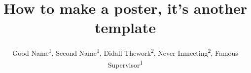 \title{How to make a poster, it's another template}
\author{Good Name\textsuperscript{1}, Second Name\textsuperscript{1}, Didall Thework\textsuperscript{2}, Never Inmeeting\textsuperscript{2}, Famous Supervisor\textsuperscript{1}}
\newcommand{\school}{School of Latex and Writing}
\newcommand{\university}{Heriot-Watt University}
\newcommand{\monthDate}{September}
\newcommand{\yearDate}{2042}

